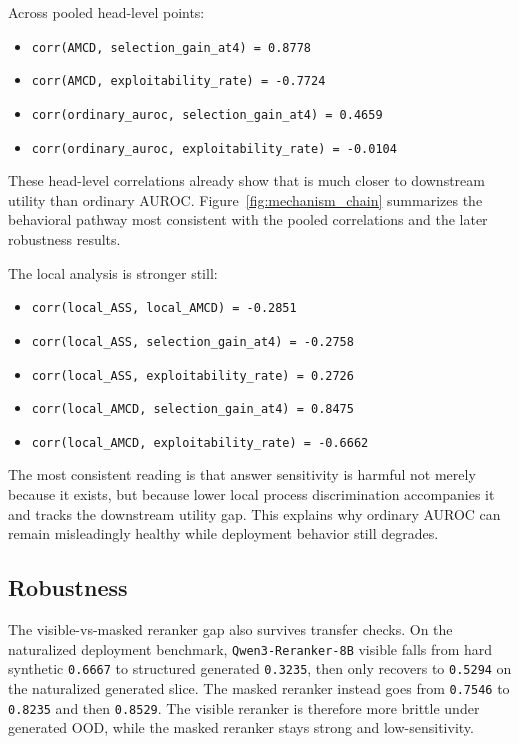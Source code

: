 Across pooled head-level points:
\begin{itemize}[leftmargin=1.5em]
\item \texttt{corr(AMCD, selection\_gain\_at4) = 0.8778}
\item \texttt{corr(AMCD, exploitability\_rate) = -0.7724}
\item \texttt{corr(ordinary\_auroc, selection\_gain\_at4) = 0.4659}
\item \texttt{corr(ordinary\_auroc, exploitability\_rate) = -0.0104}
\end{itemize}
These head-level correlations already show that \amcd{} is much closer to
downstream utility than ordinary AUROC. Figure~\ref{fig:mechanism_chain}
summarizes the behavioral pathway most consistent with the pooled correlations
and the later robustness results.

The local analysis is stronger still:
\begin{itemize}[leftmargin=1.5em]
\item \texttt{corr(local\_ASS, local\_AMCD) = -0.2851}
\item \texttt{corr(local\_ASS, selection\_gain\_at4) = -0.2758}
\item \texttt{corr(local\_ASS, exploitability\_rate) = 0.2726}
\item \texttt{corr(local\_AMCD, selection\_gain\_at4) = 0.8475}
\item \texttt{corr(local\_AMCD, exploitability\_rate) = -0.6662}
\end{itemize}
The most consistent reading is that answer sensitivity is harmful not merely
because it exists, but because lower local process discrimination accompanies
it and tracks the downstream utility gap. This explains why ordinary AUROC can
remain misleadingly healthy while deployment behavior still degrades.

\subsection{Robustness}

The visible-vs-masked reranker gap also survives transfer checks.
On the naturalized deployment benchmark, \texttt{Qwen3-Reranker-8B} visible
falls from hard synthetic \amcd{} \texttt{0.6667} to structured generated
\texttt{0.3235}, then only recovers to \texttt{0.5294} on the naturalized
generated slice. The masked reranker instead goes from \texttt{0.7546} to
\texttt{0.8235} and then \texttt{0.8529}. The visible reranker is therefore
more brittle under generated OOD, while the masked reranker stays strong and
low-sensitivity.

